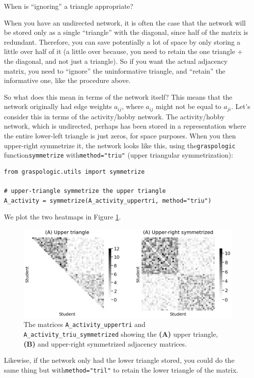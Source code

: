 \begin{floatingbox}[h]
\caption{When is ``ignoring'' a triangle appropriate?}

When you have an undirected network, it is often the case that the network will be stored only as a single ``triangle'' with the diagonal, since half of the matrix is redundant. Therefore, you can save potentially a lot of space by only storing a little over half of it (a little over because, you need to retain the one triangle + the diagonal, and not just a triangle). So if you want the actual adjacency matrix, you need to ``ignore'' the uninformative triangle, and ``retain'' the informative one, like the procedure above.
\end{floatingbox}


So what does this mean in terms of the network itself? This means that the network originally had edge weights $a_{ij}$, where $a_{ij}$ might not be equal to $a_{ji}$. Let's consider this in terms of the activity/hobby network. The activity/hobby network, which is undirected, perhaps has been stored in a representation where the entire lower-left triangle is just zeros, for space purposes. When you then upper-right symmetrize it, the network looks like this, using the\texttt{graspologic} function\texttt{symmetrize} with\texttt{method="triu"} (upper triangular symmetrization):


\begin{lstlisting}[style=python]
from graspologic.utils import symmetrize

# upper-triangle symmetrize the upper triangle
A_activity = symmetrize(A_activity_uppertri, method="triu")
\end{lstlisting}
We plot the two heatmaps in Figure \ref{fig:ch4:triusym}.

\begin{figure}[h]
    \centering
    \includegraphics[width=\linewidth]{representations/ch4/Images/triusym.png}
    \caption[Symmetrization through discarding a triangle]{The matrices \texttt{A\_activity\_uppertri} and \texttt{A\_activity\_triu\_symmetrized} showing the \textbf{(A)} upper triangle, \textbf{(B)} and upper-right symmetrized adjacency matrices.}
    \label{fig:ch4:triusym}
\end{figure}
Likewise, if the network only had the lower triangle stored, you could do the same thing but with\texttt{method="tril"} to retain the lower triangle of the matrix.


